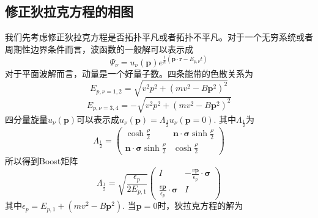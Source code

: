 \documentclass{article}
\numberwithin{equation}{subsection}
\begin{document}
\subsection{修正狄拉克方程的相图}
我们先考虑修正狄拉克方程是否拓扑平凡或者拓扑不平凡。对于一个无穷系统或者周期性边界条件而言，波函数的一般解可以表示成
\begin{equation}
    \Psi_\nu=u_\nu(\mathbf{p})e^{\frac{i}{\hbar}(\mathbf{p}\cdot\mathbf{r}-E_{p,\nu}t)}
\end{equation}
对于平面波解而言，动量是一个好量子数。四条能带的色散关系为
\begin{equation}
    E_{p,\nu=1,2}=\sqrt{v^2p^2+(mv^2-B\mathbf{p}^2)^2}
\end{equation}
\begin{equation}
    E_{p,\nu=3,4}=-\sqrt{v^2p^2+(mv^2-B\mathbf{p}^2)^2}
\end{equation}
四分量旋量$u_\nu(\mathbf{p})$可以表示成$u_\nu(\mathbf{p})=\Lambda_{\frac{1}{2}}u_{\nu}(\mathbf{p}=0)$. 其中$\Lambda_{\frac{1}{2}}$为
\begin{equation}
    \Lambda_{\frac{1}{2}}=\begin{pmatrix}
        \cosh\frac{\rho}{2}&\mathbf{n}\cdot\mathbf{\sigma}\sinh\frac{\rho}{2}\\
        \mathbf{n}\cdot\mathbf{\sigma}\sinh\frac{\rho}{2}&\cosh\frac{\rho}{2}
    \end{pmatrix}
\end{equation}
所以得到Boost矩阵
\begin{equation}
    \Lambda_{\frac{1}{2}}=\sqrt{\frac{\epsilon_p}{2E_{p,1}}}\begin{pmatrix}
        I&-\frac{v\mathbf{p}}{\epsilon_p}\cdot\mathbf{\sigma}\\
        \frac{v\mathbf{p}}{\epsilon_p}\cdot\mathbf{\sigma}&I
    \end{pmatrix}
\end{equation}
其中$\epsilon_p=E_{p,1}+(mv^2-B\mathbf{p}^2)$. 当$\mathbf{p}=0$时，狄拉克方程的解为
\end{document}
